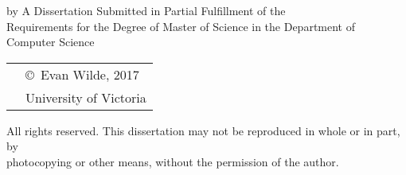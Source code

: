 \pagebreak
{
\centering
\thesistitle
\tpbreak
by
\tpbreak
\nameanddegrees
\tpbreak
A Dissertation Submitted in Partial Fulfillment of the \\
Requirements for the Degree of
\tpbreak
Master of Science
\tpbreak
in the Department of Computer Science
\vfill
\begin{tabular}{cl}
& \copyright\ Evan Wilde, 2017\\
& \phantom{\copyright} University of Victoria
\end{tabular}
\tpbreak
All rights reserved. This dissertation may not be reproduced in whole or in part, by \\
\hfill photocopying or other means, without the permission of the author.
\hfill
}
\pagebreak
